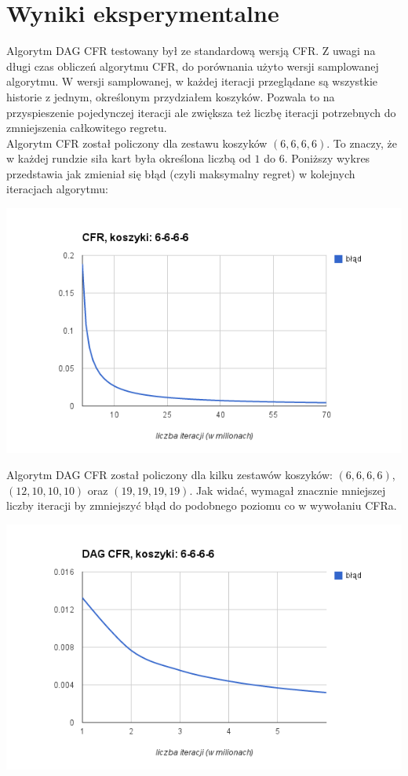 \documentclass[licencjacka]{pracamgr}
\begin{document}
\chapter{Wyniki eksperymentalne}

\noindent
Algorytm DAG CFR testowany był ze standardową wersją CFR. Z uwagi na długi czas obliczeń
algorytmu CFR, do porównania użyto wersji samplowanej algorytmu. W wersji samplowanej,
w każdej iteracji przeglądane są wszystkie historie z jednym, określonym przydziałem koszyków.
Pozwala to na przyspieszenie pojedynczej iteracji ale zwiększa też liczbę iteracji potrzebnych do
zmniejszenia całkowitego regretu. \\

\noindent
Algorytm CFR został policzony dla zestawu koszyków $(6,6,6,6)$. To znaczy, że w każdej rundzie
siła kart była określona liczbą od $1$ do $6$. Poniższy wykres przedstawia jak zmieniał się
błąd (czyli maksymalny regret) w kolejnych iteracjach algorytmu:

\includegraphics[scale=0.7]{wykres-cfr-6.png}

\noindent
Algorytm DAG CFR został policzony dla kilku zestawów koszyków: $(6,6,6,6)$, $(12,10,10,10)$ oraz $(19,19,19,19)$.
Jak widać, wymagał znacznie mniejszej liczby iteracji by zmniejszyć błąd do podobnego poziomu co w wywołaniu CFRa.

\includegraphics[scale=0.7]{wykres-dag-6.png}
\end{document}
